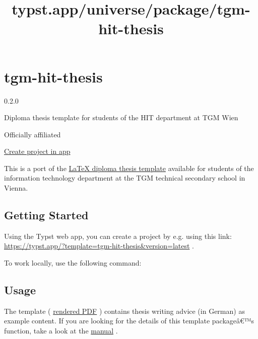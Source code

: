 \title{typst.app/universe/package/tgm-hit-thesis}

\label{banner}
\label{template-thumbnail}

\section{tgm-hit-thesis}\label{tgm-hit-thesis}

{ 0.2.0 }

Diploma thesis template for students of the HIT department at TGM Wien

{ } Officially affiliated

\href{/app?template=tgm-hit-thesis&version=0.2.0}{Create project in app}

\label{readme}
This is a port of the
\href{https://github.com/TGM-HIT/diploma-thesis}{LaTeX diploma thesis
template} available for students of the information technology
department at the TGM technical secondary school in Vienna.

\subsection{Getting Started}\label{getting-started}

Using the Typst web app, you can create a project by e.g. using this
link: \url{https://typst.app/?template=tgm-hit-thesis&version=latest} .

To work locally, use the following command:

\begin{Shaded}
\begin{Highlighting}[]
\end{Highlighting}
\end{Shaded}

\subsection{Usage}\label{usage}

The template (
\href{https://github.com/typst/packages/raw/main/packages/preview/tgm-hit-thesis/0.2.0/example.pdf}{rendered
PDF} ) contains thesis writing advice (in German) as example content. If
you are looking for the details of this template packageâ€™s function,
take a look at the
\href{https://github.com/typst/packages/raw/main/packages/preview/tgm-hit-thesis/0.2.0/docs/manual.pdf}{manual}
.

